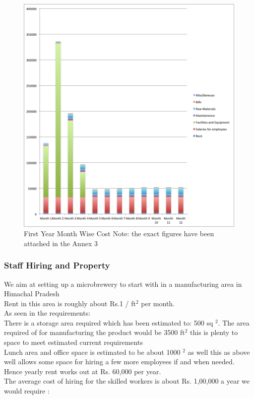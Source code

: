 \documentclass[11pt]{article}
\begin{document}
	\begin{figure}[h!]
	\caption{First Year Month Wise Cost \newline Note: the exact figures have been attached in the Annex 3}
	\centering
	\includegraphics[width=\textwidth]{monthWiseCost.png}
	\end{figure}


      \subsubsection{Staff Hiring and Property}
We aim at setting up a microbrewery to start with in a manufacturing area in Himachal Pradesh \\
Rent in this area is roughly about Rs.1 / ft$^2$ per month. \\
As seen in the requirements: \\
There is a storage area required which has been estimated to: 500 sq $^2$. The area required of for manufacturing the product would be 3500 ft$^2$ this is plenty to space to meet estimated current requirements \\
Lunch area and office space is estimated to be about 1000 $^2$ as well this as above well allows some space for hiring a few more employees if and when needed. \\
Hence yearly rent works out at Rs. 60,000 per year. \\
The average cost of hiring for the skilled workers is about Rs. 1,00,000 a year we would require :
\end{document}
